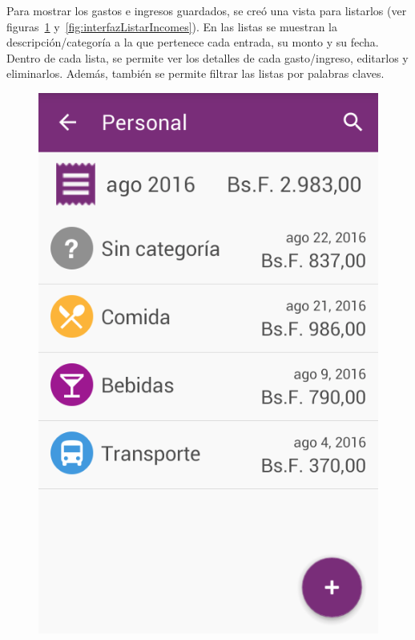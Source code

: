 Para mostrar los gastos e ingresos guardados, se creó una vista para listarlos (ver figuras~\ref{fig:interfazListarExpenses} y~\ref{fig:interfazListarIncomes}). En las listas se muestran la descripción/categoría a la que pertenece cada entrada, su monto y su fecha. Dentro de cada lista, se permite ver los detalles de cada gasto/ingreso, editarlos y eliminarlos. Además, también se permite filtrar las listas por palabras claves.

\begin{figure}[ht]
\centering
\begin{minipage}{.5\textwidth}
  \centering
  \includegraphics[scale=0.4,type=png,ext=.png,read=.png]{imagenes/expenses_list}
  \captionsetup{justification=centering}
  \label{fig:interfazListarExpenses}

\end{minipage}
\end{figure}
